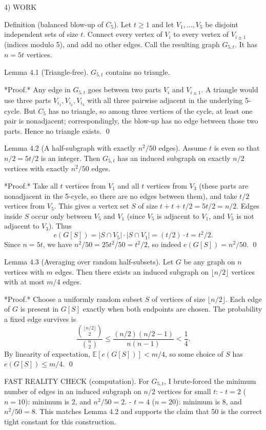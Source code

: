 4) WORK

Definition (balanced blow-up of $C_5$).
Let $t\ge 1$ and let $V_1,\dots,V_5$ be disjoint independent sets of size $t$.
Connect every vertex of $V_i$ to every vertex of $V_{i\pm 1}$ (indices modulo 5), and add no other edges.
Call the resulting graph $G_{5,t}$.
It has $n=5t$ vertices.

Lemma 4.1 (Triangle-free).
$G_{5,t}$ contains no triangle.

*Proof.* Any edge in $G_{5,t}$ goes between two parts $V_i$ and $V_{i\pm 1}$.
A triangle would use three parts $V_{i_1},V_{i_2},V_{i_3}$ with all three pairwise adjacent in the underlying 5-cycle.
But $C_5$ has no triangle, so among three vertices of the cycle, at least one pair is nonadjacent; correspondingly, the blow-up has no edge between those two parts.
Hence no triangle exists. \qed

Lemma 4.2 (A half-subgraph with exactly $n^2/50$ edges).
Assume $t$ is even so that $n/2=5t/2$ is an integer.
Then $G_{5,t}$ has an induced subgraph on exactly $n/2$ vertices with exactly $n^2/50$ edges.

*Proof.* Take all $t$ vertices from $V_1$ and all $t$ vertices from $V_3$ (these parts are nonadjacent in the 5-cycle, so there are no edges between them), and take $t/2$ vertices from $V_5$.
This gives a vertex set $S$ of size $t+t+t/2=5t/2=n/2$.
Edges inside $S$ occur only between $V_5$ and $V_1$ (since $V_5$ is adjacent to $V_1$, and $V_5$ is not adjacent to $V_3$).
Thus
\[
 e(G[S]) = |S\cap V_5|\cdot |S\cap V_1| = (t/2)\cdot t = t^2/2.
\]
Since $n=5t$, we have $n^2/50 = 25t^2/50 = t^2/2$, so indeed $e(G[S])=n^2/50$. \qed

Lemma 4.3 (Averaging over random half-subsets).
Let $G$ be any graph on $n$ vertices with $m$ edges.
Then there exists an induced subgraph on $\lfloor n/2\rfloor$ vertices with at most $m/4$ edges.

*Proof.* Choose a uniformly random subset $S$ of vertices of size $\lfloor n/2\rfloor$.
Each edge of $G$ is present in $G[S]$ exactly when both endpoints are chosen.
The probability a fixed edge survives is
\[
\frac{\binom{\lfloor n/2\rfloor}{2}}{\binom{n}{2}} \le \frac{(n/2)(n/2-1)}{n(n-1)} < \frac14.
\]
By linearity of expectation, $\mathbb{E}[e(G[S])] < m/4$, so some choice of $S$ has $e(G[S])\le m/4$. \qed

FAST REALITY CHECK (computation).
For $G_{5,t}$, I brute-forced the minimum number of edges in an induced subgraph on $n/2$ vertices for small $t$:
- $t=2$ ($n=10$): minimum is 2, and $n^2/50=2$.
- $t=4$ ($n=20$): minimum is 8, and $n^2/50=8$.
This matches Lemma 4.2 and supports the claim that 50 is the correct tight constant for this construction.

